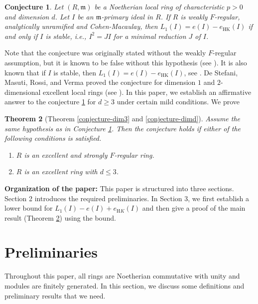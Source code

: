 \documentclass[11pt, reqno]{amsart}
\theoremstyle{plain}
\newtheorem{theorem}{Theorem}[section]
\newtheorem{conjecture}[theorem]{Conjecture}
\theoremstyle{plain}
\begin{document}
\begin{conjecture}\label{conj}
    Let $(R,\mathfrak{m})$ be a Noetherian local ring of characteristic $p>0$ and dimension $d$. Let $I$ be an $\mathfrak{m}$-primary ideal in $R$. If $R$ is weakly $F$-regular, analytically unramified and Cohen-Macaulay, then $\displaystyle L_1(I)=e(I)-e_{\mathrm{HK}}(I)$ if and only if $I$ is stable, i.e., $I^2=JI$ for a minimal reduction $J$ of $I$.
\end{conjecture}
 

Note that the conjecture was originally stated without the weakly $F$-regular assumption, but it is known to be false without this hypothesis (see \cite{goel}). It is also known that if $I$ is stable, then $\displaystyle L_1(I)=e(I)-e_{\mathrm{HK}}(I)$, see \cite[Theorem 1.8(2)]{watanabe}. De Stefani, Masuti, Rossi, and Verma \cite{shreedevi} proved the conjecture for dimension $1$ and $2$-dimensional excellent local rings (see \cite[Corollary 2.2, Theorem 4.9]{shreedevi}). In this paper, we establish an affirmative answer to the conjecture \ref{conj} for $d\geq 3$ under certain mild conditions. We prove

\begin{theorem}[Theorem \ref{conjecture-dim3} and \ref{conjecture-dimd}]\label{1}
    Assume the same hypothesis as in Conjecture \ref{conj}. Then the conjecture holds if either of the following conditions is satisfied.
    \begin{enumerate}
        \item  $R$ is an excellent and strongly $F$-regular ring.
         \item $R$ is an excellent ring with $d\leq 3$.
    \end{enumerate}
\end{theorem}

\noindent
\textbf{Organization of the paper:} This paper is structured into three sections. Section 2 introduces the required preliminaries. In Section 3, we first establish a lower bound for $L_1(I)-e(I)+e_{\mathrm HK}(I)$ and then give a proof of the main result (Theorem \ref{1}) using the bound.

\section{Preliminaries}
Throughout this paper, all rings are Noetherian commutative with unity and modules are finitely generated. In this section, we discuss some definitions and preliminary results that we need.
\end{document}

